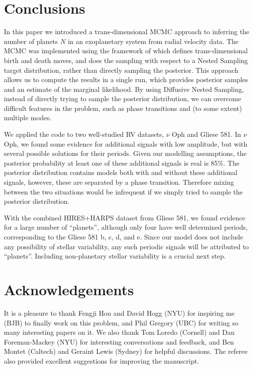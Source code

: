 \documentclass[useAMS,usenatbib]{mn2e}
\begin{document}
\section{Conclusions}
In this paper we introduced a trans-dimensional MCMC approach to inferring
the number of planets $N$ in an exoplanetary system from radial velocity data.
The MCMC was implemented using the framework of \citet{rjobject} which
defines trans-dimensional birth and death moves, and does the sampling
with respect to a Nested Sampling target distribution, rather than directly
sampling the posterior. This approach allows us to compute the results in a
single run, which provides posterior samples and an estimate of the marginal
likelihood. By using Diffusive Nested Sampling, instead of
directly trying to sample the posterior distribution, we can overcome difficult
features in the problem, such as phase transitions and (to some extent)
multiple modes.

We applied the code to two well-studied RV datasets, $\nu$ Oph and Gliese 581.
In $\nu$ Oph, we found some evidence for additional signals with low amplitude,
but with several possible solutions for their periods. Given our modelling
assumptions, the posterior probability at least one of these additional signals
is real is 85\%. The posterior distribution contains models both with and without
these additional signals, however, these are separated by a phase transition.
Therefore mixing between the two situations would be infrequent if we simply
tried to sample the posterior distribution.

With the combined HIRES+HARPS dataset from Gliese 581, we found
evidence for a large number of ``planets'', although only four have well
determined periods, corresponding to the Gliese 581 b, c, d,
and e. Since our model does not include any possibility of stellar variability,
any such periodic signals will be attributed to ``planets''.
Including non-planetary stellar variability is a crucial next step.

\vspace{-0.5cm}
\section*{Acknowledgements}
It is a pleasure to thank Fengji Hou and David Hogg (NYU) for inspiring me (BJB) to
finally work on this problem, and Phil Gregory (UBC) for writing so many
interesting papers on it. We also thank Tom Loredo (Cornell) and Dan
Foreman-Mackey (NYU) for interesting conversations and feedback, and Ben
Montet (Caltech) and Geraint Lewis (Sydney) for helpful discussions.
The referee also provided excellent suggestions for improving the manuscript.
\end{document}

